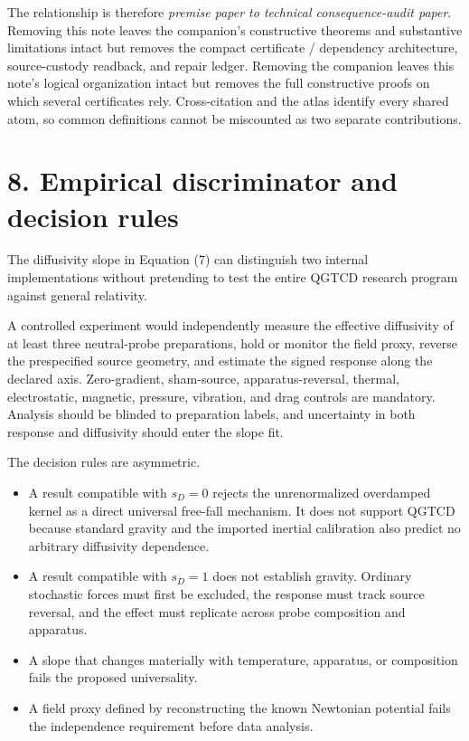 \documentclass[
  american,
  11pt,
  letterpaper,
]{article}
\providecommand{\tightlist}{%
  \setlength{\itemsep}{0pt}\setlength{\parskip}{0pt}}
\begin{document}
The relationship is therefore \emph{premise paper to technical consequence-audit paper}. Removing this note leaves the companion's constructive theorems and substantive limitations intact but removes the compact certificate / dependency architecture, source-custody readback, and repair ledger. Removing the companion leaves this note's logical organization intact but removes the full constructive proofs on which several certificates rely. Cross-citation and the atlas identify every shared atom, so common definitions cannot be miscounted as two separate contributions.

\section{8. Empirical discriminator and decision rules}\label{empirical-discriminator-and-decision-rules}

The diffusivity slope in Equation (7) can distinguish two internal implementations without pretending to test the entire QGTCD research program against general relativity.

A controlled experiment would independently measure the effective diffusivity of at least three neutral-probe preparations, hold or monitor the field proxy, reverse the prespecified source geometry, and estimate the signed response along the declared axis. Zero-gradient, sham-source, apparatus-reversal, thermal, electrostatic, magnetic, pressure, vibration, and drag controls are mandatory. Analysis should be blinded to preparation labels, and uncertainty in both response and diffusivity should enter the slope fit.

The decision rules are asymmetric.

\begin{itemize}
\tightlist
\item
  A result compatible with \(s_D=0\) rejects the unrenormalized overdamped kernel as a direct universal free-fall mechanism. It does not support QGTCD because standard gravity and the imported inertial calibration also predict no arbitrary diffusivity dependence.
\item
  A result compatible with \(s_D=1\) does not establish gravity. Ordinary stochastic forces must first be excluded, the response must track source reversal, and the effect must replicate across probe composition and apparatus.
\item
  A slope that changes materially with temperature, apparatus, or composition fails the proposed universality.
\item
  A field proxy defined by reconstructing the known Newtonian potential fails the independence requirement before data analysis.
\end{itemize}
\end{document}
